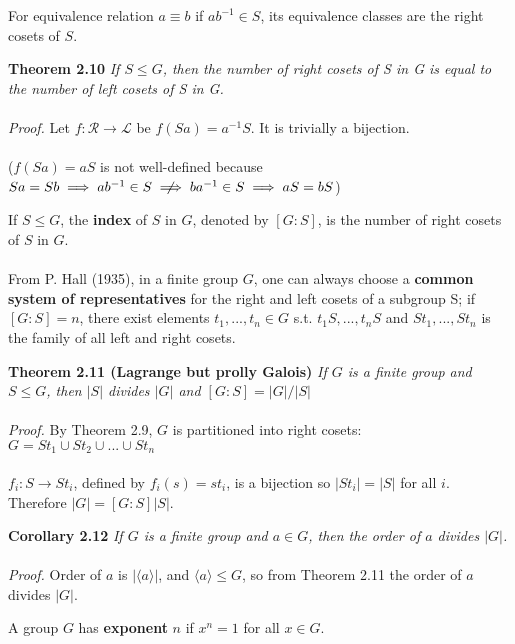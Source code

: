 \documentclass{article}
\begin{document}
For equivalence relation  \(a\equiv b\) if \(ab^{-1}\in S\), its equivalence classes are the right cosets of \(S\).
\begin{redrules}\color{red}
\textbf{Theorem 2.10} \textit{If \(S\le G\), then the number of right cosets of S in G is equal to the number of left cosets of S in G.}\\\\\color{black}
\textit{Proof.} Let \(f:\mathscr{R}\to\mathscr{L}\) be \(f(Sa)=a^{-1}S\). It is trivially a bijection.\\\\
(\(f(Sa)=aS\) is not well-defined because \(Sa=Sb\implies ab^{-1}\in S\centernot\implies ba^{-1}\in S\implies aS=bS\))
\end{redrules}
If \(S\le G\), the \textbf{index} of \(S\) in \(G\), denoted by \([G:S]\), is the number of right cosets of \(S\) in \(G\).\\\\
From P. Hall (1935), in a finite group \(G\), one can always choose a \textbf{common system of representatives} for the right and left cosets of a subgroup S; 
if \([G:S]=n\), there exist elements \(t_{1},...,t_{n}\in G\) s.t. \(t_{1}S,...,t_{n}S\) and \(St_{1},...,St_{n}\) is the family 
of all left and right cosets.
\begin{redrules}\color{red}
\textbf{Theorem 2.11 (Lagrange but prolly Galois)} \textit{If \(G\) is a finite group and \(S\le G\), then \(|S|\) divides \(|G|\) and 
\([G:S]=|G|/|S|\)}\\\\\color{black}
\textit{Proof.} By \color{gray}Theorem 2.9\color{black}, \(G\) is partitioned into right cosets: \(G=St_{1}\cup St_{2}\cup...\cup St_{n}\)\\\\
\(f_{i}:S\to St_{i}\), defined by \(f_{i}(s)=st_{i}\), is a bijection so \(|St_{i}|=|S|\) for all \(i\). Therefore \(|G|=[G:S]|S|\).
\end{redrules}
\begin{greenrules}\color{OliveGreen}
\textbf{Corollary 2.12} \textit{If \(G\) is a finite group and \(a\in G\), then the order of \(a\) divides \(|G|\).}\\\\\color{black}
\textit{Proof.} Order of \(a\) is \(|\langle a\rangle|\), and \(\langle a\rangle\le G\), so from \color{gray}Theorem 2.11 \color{black} the order of \(a\) divides \(|G|\).
\end{greenrules}
A group \(G\) has \textbf{exponent} \(n\) if \(x^{n}=1\) for all \(x\in G\).\\\\
\end{document}
